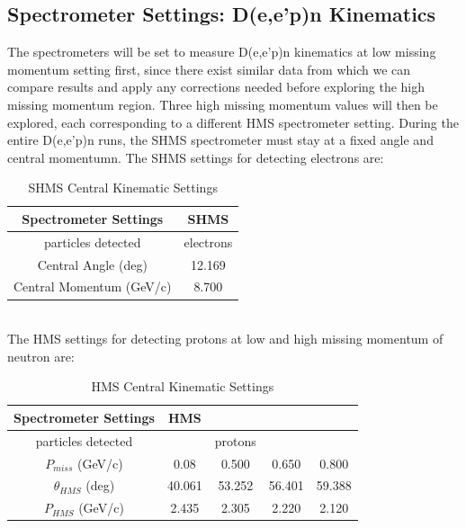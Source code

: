 \documentclass[letterpaper, 12 pt, conference]{ieeeconf}  %
\begin{document}
\subsection{Spectrometer Settings: D(e,e'p)n Kinematics}
The spectrometers will be set to measure D(e,e'p)n kinematics at low missing momentum setting first,
since there exist similar data from which we can compare results and apply any
corrections needed before exploring the high missing momentum region. Three high missing momentum values will then be explored,
each corresponding to a different HMS spectrometer setting. During the entire D(e,e'p)n runs, the SHMS spectrometer must stay at a
fixed angle and central momentumn. The SHMS settings for detecting electrons are:
\begin{table}[ht]
\caption{SHMS Central Kinematic Settings}
\centering
{\def\arraystretch{1.6}\tabcolsep=5pt
\begin{tabular}{c c}
\hline\hline
\textbf{Spectrometer Settings} & \textbf{SHMS} \\ [0.5ex] %
\hline
particles detected                  & electrons \\
Central Angle (deg)        & 12.169  \\
Central Momentum (GeV/c)   & 8.700  \\ [1ex]
\hline
\end{tabular}
}
\label{Table:shms_d2_kin}
\end{table} \\
The HMS settings for detecting protons at low and high missing momentum of neutron are:
\begin{table}[ht]
\caption{HMS Central Kinematic Settings}
\centering
{\def\arraystretch{1.6}\tabcolsep=2pt
\begin{tabular}{c c c c c}
\hline\hline
\textbf{Spectrometer Settings} & \textbf{HMS} \\ [0.5ex] %
\hline
particles  detected                &           &    protons &  \\
\hline
$P_{miss}$ (GeV/c)           & 0.08     &  0.500  & 0.650 & 0.800\\
$\theta_{HMS}$ (deg)       & 40.061   & 53.252    & 56.401 & 59.388  \\    
$P_{HMS}$ (GeV/c)            & 2.435    & 2.305    & 2.220 & 2.120  \\
\hline
\end{tabular}
}
\label{Table:hms_d2_kin}
\end{table} \\
\end{document}
